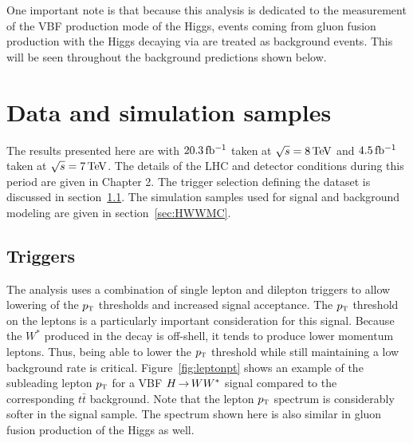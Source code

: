 One important note is that because this analysis is dedicated to the measurement of the VBF production mode of the Higgs, events coming from gluon fusion production with the Higgs decaying via \HWWfull are treated as background events. This will be seen throughout the background predictions shown below. 

 

\section{Data and simulation samples}

The results presented here are with $20.3 \mbox{\,fb$^{-1}$}$ taken at $\sqrt{s} = 8 \TeV$ and $4.5 \mbox{\,fb$^{-1}$}$ taken at $\sqrt{s} = 7 \TeV$. The details of the LHC and detector conditions during this period are given in Chapter 2. The trigger selection defining the dataset is discussed in section~\ref{sec:HWWtrigger}. The simulation samples used for signal and background modeling are given in section~\ref{sec:HWWMC}.

\subsection{Triggers}
\label{sec:HWWtrigger}

The analysis uses a combination of single lepton and dilepton triggers to allow lowering of the $p_{\textrm{\footnotesize\sc t}}$ thresholds and increased signal acceptance. The $p_{\textrm{\footnotesize\sc t}}$ threshold on the leptons is a particularly important consideration for this signal. Because the $W^*$ produced in the decay is off-shell, it tends to produce lower momentum leptons. Thus, being able to lower the $p_{\textrm{\footnotesize\sc t}}$ threshold while still maintaining a low background rate is critical. Figure~\ref{fig:leptonpt} shows an example of the subleading lepton $p_{\textrm{\footnotesize\sc t}}$ for a VBF $H{\,{\rightarrow}\,}WW^\ast$ signal compared to the corresponding $t\bar{t}$ background. Note that the lepton $p_{\textrm{\footnotesize\sc t}}$ spectrum is considerably softer in the signal sample. The spectrum shown here is also similar in gluon fusion production of the Higgs as well. 

